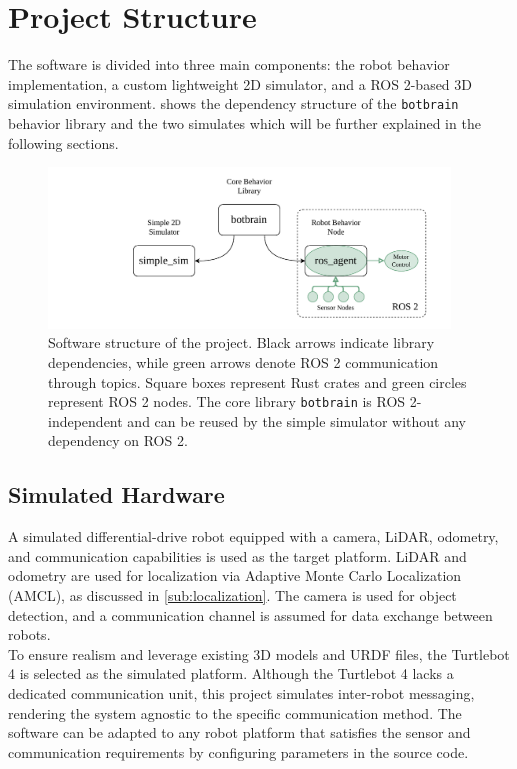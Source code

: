 \section{Project Structure}
The software is divided into three main components: the robot behavior implementation, a custom lightweight 2D simulator, and a ROS 2-based 3D simulation environment.  shows the dependency structure of the \texttt{botbrain} behavior library and the two simulates which will be further explained in the following sections.

\begin{figure}[H]
    \begin{center}
        \includegraphics[width=0.95\textwidth]{figures/software-structure.pdf}
    \end{center}
    \caption{Software structure of the project. Black arrows indicate library dependencies, while green arrows denote ROS 2 communication through topics. Square boxes represent Rust crates and green circles represent ROS 2 nodes. The core library \texttt{botbrain} is ROS 2-independent and can be reused by the simple simulator without any dependency on ROS 2.}
    \label{fig:software-structure}
\end{figure}

\subsection{Simulated Hardware}
A simulated differential-drive robot equipped with a camera, LiDAR, odometry, and communication capabilities is used as the target platform. LiDAR and odometry are used for localization via Adaptive Monte Carlo Localization (AMCL), as discussed in \cref{sub:localization}. The camera is used for object detection, and a communication channel is assumed for data exchange between robots.\\

To ensure realism and leverage existing 3D models and URDF files, the Turtlebot 4 \cite{tb4} is selected as the simulated platform. Although the Turtlebot 4 lacks a dedicated communication unit, this project simulates inter-robot messaging, rendering the system agnostic to the specific communication method. The software can be adapted to any robot platform that satisfies the sensor and communication requirements by configuring parameters in the source code.

